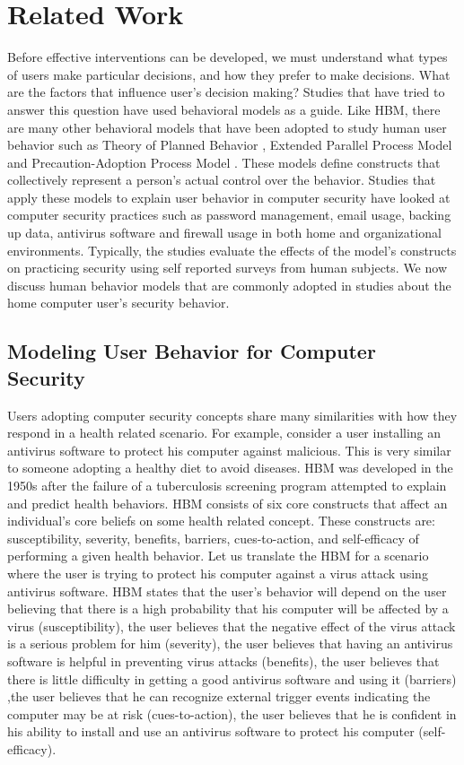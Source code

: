 \section{Related Work}
Before effective interventions can be developed, we must understand what types of users make particular decisions, and how they prefer to make decisions. 
What are the factors that influence user's decision making? 
Studies that have tried to answer this question have used behavioral models as a guide. Like HBM, there are many other behavioral models that have been adopted to study human user behavior such as Theory of Planned Behavior \cite{ajzen1991}, Extended Parallel Process Model \cite{witte1992} and Precaution-Adoption Process  Model \cite{weinstein2002}. 
These models define constructs that collectively represent a person's actual control over the behavior. 
Studies that apply these models to explain user behavior in computer security have looked at computer security practices such as password management, email usage, backing up data, antivirus software and firewall usage in both home and organizational environments. Typically, the studies evaluate the effects of the model's constructs on practicing security using self reported surveys from human subjects. 
We now discuss human behavior models that are commonly adopted in studies about the home computer user's security behavior.


\subsection{Modeling User Behavior for Computer Security}
Users adopting computer security concepts share many similarities with how they respond in a health related scenario. 
For example, consider a user installing an antivirus software to protect his computer against malicious. 
This is very similar to someone adopting a healthy diet to avoid diseases. HBM was developed in the 1950s after the failure of a tuberculosis screening program attempted to explain and predict health behaviors. HBM consists of six core constructs that affect an individual's core beliefs on some health related concept. These constructs are: susceptibility, severity, benefits, barriers, cues-to-action, and self-efficacy of performing a given health behavior. Let us translate the HBM for a scenario where the user is trying to protect his computer against a virus attack using antivirus software. HBM states that the user's behavior will depend on the user believing that there is a high probability that his computer will be affected by a virus (susceptibility), the user believes that the negative effect of the virus attack is a serious problem for him (severity), the user believes that having an antivirus software is helpful in preventing virus attacks (benefits), the user believes that there is little difficulty in getting a good antivirus software and using it (barriers) ,the user believes that he can recognize external trigger events indicating the computer may be at risk (cues-to-action), the user believes that he is confident in his ability to install and use an antivirus software to protect his computer (self-efficacy).

